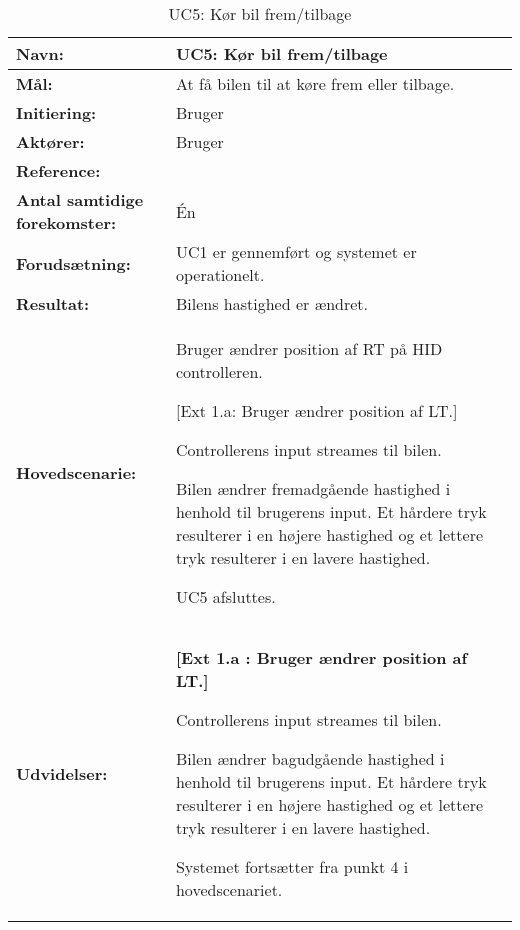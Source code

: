 \begin{table}[h]
\begin{tabularx}{\textwidth}{| L{3.3 cm} | Z |} \hline

\textbf{Navn:} 						& UC5: Kør bil frem/tilbage\\ \hline
\textbf{Mål:}						& At få bilen til at køre frem eller tilbage. \\ \hline
\textbf{Initiering:}				& Bruger \\ \hline
\textbf{Aktører:} 					& Bruger \\ \hline
\textbf{Reference:} 				& \\ \hline
\textbf{Antal samtidige forekomster:} & Én \\ \hline
\textbf{Forudsætning:} 				& UC1 er gennemført og systemet er operationelt. \\ \hline
\textbf{Resultat:}					& Bilens hastighed er ændret. \\ \hline
\textbf{Hovedscenarie:}				& 

\begin{packed_enum}
\item Bruger ændrer position af RT på HID controlleren.
	\begin{packed_item}\itemsep1pt \parskip0pt 
	\item {[}Ext 1.a: Bruger ændrer position af LT.{]}
	\end{packed_item}
\item Controllerens input streames til bilen.
\item Bilen ændrer fremadgående hastighed i henhold til brugerens input. Et hårdere tryk resulterer i en højere hastighed og et lettere tryk resulterer i en lavere hastighed.
\item UC5 afsluttes.
\end{packed_enum} \\ \hline
\textbf{Udvidelser:}				&  
\textbf{{[}Ext 1.a : Bruger ændrer position af LT.{]}}
	\begin{packed_enum}\itemsep1pt \parskip0pt 
		\item Controllerens input streames til bilen.
		\item Bilen ændrer bagudgående hastighed i henhold til brugerens input. Et hårdere tryk resulterer i en højere hastighed og et lettere tryk resulterer i en lavere hastighed.
		\item Systemet fortsætter fra punkt 4 i hovedscenariet.
	\end{packed_enum}
\\ \hline
\end{tabularx}
\caption{UC5: Kør bil frem/tilbage}
\label{tbl:UC5}
\end{table}
